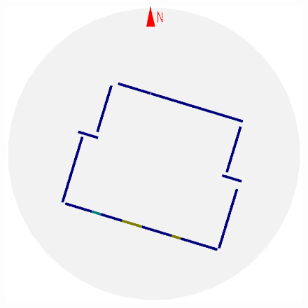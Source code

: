 \begin{figure}[t]
\begin{minipage}[b]{0.14\textwidth}
  \includegraphics[width=\textwidth]{p4m_1_2D_walls_rotate} %
\end{minipage}


\end{figure}
